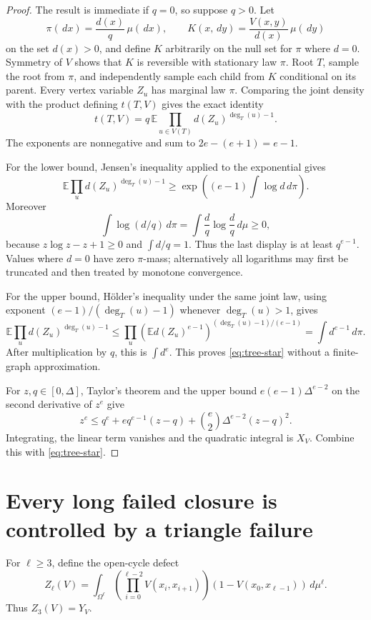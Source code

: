\documentclass[11pt]{article}
\newcommand{\dd}{\,d}
\begin{document}
\begin{proof}
The result is immediate if $q=0$, so suppose $q>0$.  Let
\[
 \pi(\dd x)=\frac{d(x)}q\,\mu(\dd x),
 \qquad
 K(x,\dd y)=\frac{V(x,y)}{d(x)}\,\mu(\dd y)
\]
on the set $d(x)>0$, and define $K$ arbitrarily on the null set for $\pi$
where $d=0$.  Symmetry of $V$ shows that $K$ is reversible with stationary
law $\pi$.  Root $T$, sample the root from $\pi$, and independently sample
each child from $K$ conditional on its parent.  Every vertex variable $Z_u$
has marginal law $\pi$.  Comparing the joint density with the product
defining $t(T,V)$ gives the exact identity
\begin{equation}
 t(T,V)=q\,\mathbb E
 \prod_{u\in V(T)}d(Z_u)^{\deg_T(u)-1}.
 \label{eq:tree-markov}
\end{equation}
The exponents are nonnegative and sum to
$2e-(e+1)=e-1$.

For the lower bound, Jensen's inequality applied to the exponential gives
\[
 \mathbb E\prod_ud(Z_u)^{\deg_T(u)-1}
 \geq
 \exp\!\left((e-1)\int\log d\dd\pi\right).
\]
Moreover
\[
 \int\log(d/q)\dd\pi
 =\int \frac dq\log\frac dq\dd\mu\geq0,
\]
because $z\log z-z+1\geq0$ and $\int d/q=1$.  Thus the last display is at
least $q^{e-1}$.  Values where $d=0$ have zero $\pi$-mass; alternatively all
logarithms may first be truncated and then treated by monotone convergence.

For the upper bound, H\"older's inequality under the same joint law, using
exponent $(e-1)/(\deg_T(u)-1)$ whenever $\deg_T(u)>1$, gives
\[
 \mathbb E\prod_ud(Z_u)^{\deg_T(u)-1}
 \leq\prod_u
 \left(\mathbb E d(Z_u)^{e-1}\right)^{(\deg_T(u)-1)/(e-1)}
 =\int d^{e-1}\dd\pi.
\]
After multiplication by $q$, this is $\int d^e$.  This proves
\eqref{eq:tree-star} without a finite-graph approximation.

For $z,q\in[0,\Delta]$, Taylor's theorem and the upper bound
$e(e-1)\Delta^{e-2}$ on the second derivative of $z^e$ give
\[
 z^e\leq q^e+eq^{e-1}(z-q)
       +\binom e2\Delta^{e-2}(z-q)^2.
\]
Integrating, the linear term vanishes and the quadratic integral is $X_V$.
Combine this with \eqref{eq:tree-star}.
\end{proof}


\section{Every long failed closure is controlled by a triangle failure}

For $\ell\geq3$, define the open-cycle defect
\[
 Z_\ell(V)=\int_{\Omega^\ell}
 \left(\prod_{i=0}^{\ell-2}V(x_i,x_{i+1})\right)
 (1-V(x_0,x_{\ell-1}))\dd\mu^\ell.
\]
Thus $Z_3(V)=Y_V$.
\end{document}
